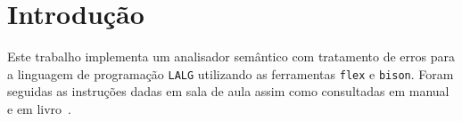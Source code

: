 \section{Introdução \label{sec:introducao}}

Este trabalho implementa um analisador semântico com tratamento de erros para a linguagem de programação \texttt{LALG} utilizando as ferramentas \texttt{flex} e \texttt{bison}. Foram seguidas as instruções dadas em sala de aula assim como consultadas em manual~\cite{bib:manual} e em livro~\cite{bib:livro}.
